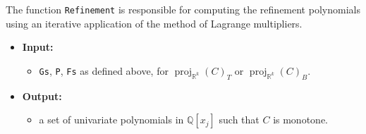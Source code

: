 \documentclass[
]{book}
\providecommand{\tightlist}{%
  \setlength{\itemsep}{0pt}\setlength{\parskip}{0pt}}
\theoremstyle{definition}
\theoremstyle{definition}
\theoremstyle{definition}
\theoremstyle{definition}
\theoremstyle{remark}
\begin{document}
The function \texttt{Refinement} is responsible for computing the refinement polynomials using an iterative application of the method of Lagrange multipliers.

\begin{itemize}
\tightlist
\item
  \textbf{Input:}

  \begin{itemize}
  \tightlist
  \item
    \texttt{Gs}, \texttt{P}, \texttt{Fs} as defined above, for \({\operatorname{proj}_{\mathbb{R}^{k}}}(C)_T\) or \({\operatorname{proj}_{\mathbb{R}^{k}}}(C)_B\).
  \end{itemize}
\item
  \textbf{Output:}

  \begin{itemize}
  \tightlist
  \item
    a set of univariate polynomials in \(\mathbb{Q}[x_j]\) such that \(C\) is monotone.
  \end{itemize}
\end{itemize}
\end{document}
